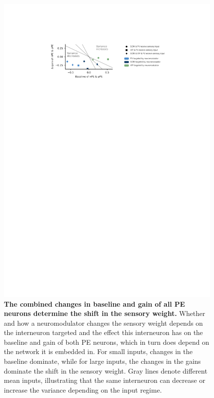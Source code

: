 \documentclass[10pt,a4paper]{article}
\begin{document}
\begin{figure}[!h]
	\centering
    \includegraphics{../results/figures/final/Fig_4_S4}%
\caption{\footnotesize{\bf The combined changes in baseline and gain of all PE neurons determine the shift in the sensory weight.\newline}  
Whether and how a neuromodulator changes the sensory weight depends on the interneuron targeted and the effect this interneuron has on the baseline and gain of both PE neurons, which in turn does depend on the network it is embedded in. For small inputs, changes in the baseline dominate, while for large inputs, the changes in the gains dominate the shift in the sensory weight. Gray lines denote different mean inputs, illustrating that the same interneuron can decrease or increase the variance depending on the input regime.
}
\label{fig:Fig_4_S4}
\end{figure}
\end{document}

